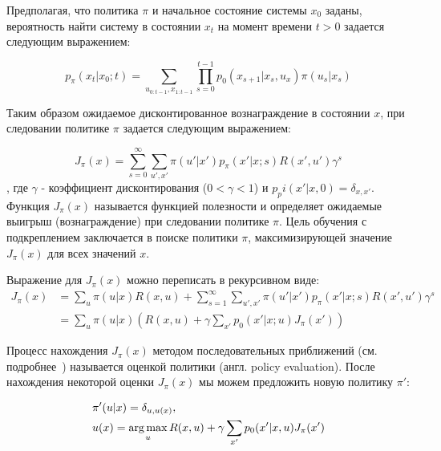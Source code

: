 Предполагая, что политика $\pi$ и начальное состояние системы $x_0$ заданы, вероятность найти систему в состоянии $x_t$ на момент времени $t > 0$ задается следующим выражением:

\begin{equation}
    \label{eq:pxxt}
     p_\pi(x_t|x_0; t) =
     \sum_{u_{0:t−1}, x_{1:t−1}}{
     	\prod_{s=0}^{t-1} {
        	p_0(x_{s+1}|x_s, u_x) \pi(u_s|x_s)
         }
      }
\end{equation}

Таким образом ожидаемое дисконтированное вознаграждение в состоянии $x$, при следовании политике $\pi$ задается следующим выражением:

\begin{equation}
    \label{eq:j_pi}
     J_{\pi}(x) =
     \sum_{s=0}^{\infty}
       \sum_{u', x'}{
          \pi(u'|x')p_\pi(x'|x; s)R(x', u')\gamma^s
        }
\end{equation}
, где $\gamma$ - коэффициент дисконтирования ($0 < \gamma < 1$) и $p_pi(x'|x, 0) = \delta_{x,x'}$. Функция $J_\pi(x)$ называется функцией полезности и определяет ожидаемые выигрыш (вознаграждение) при следовании политике $\pi$. Цель обучения с подкреплением заключается в поиске политики $\pi$, максимизирующей значение $J_\pi(x)$ для всех значений $x$.

Выражение для $J_\pi(x)$ можно переписать в рекурсивном виде:
\begin{equation}
    \label{eq:j_pi_rec}
    \begin{split}
     J_\pi(x) &=
     \sum_u {\pi(u|x)R(x,u)} +
     \sum_{s=1}^{\infty}
       \sum_{u', x'}{
          \pi(u'|x')p_\pi(x'|x; s)R(x', u')\gamma^s
        } \\
        &= \sum_u {\pi(u|x)} \left(
        R(x,u) + \gamma \sum_{x'}{
        		p_0(x'|x; u)J_{\pi}(x')
            }
       		\right)
            \end{split}
\end{equation}

Процесс нахождения $J_\pi(x)$ методом последовательных приближений (см. подробнее~\cite{sutton1998reinforcement}) называется оценкой политики (англ. policy evaluation). После нахождения некоторой оценки  $J_\pi(x)$ мы можем предложить новую политику $\pi'$:

\begin{equation}
    \label{eq:new_policy}
    \begin{split}
    & \pi'(u|x) = \delta_{u,u(x)}, \\
    & u(x) = \operatorname*{arg\,max}_u R(x, u) + \gamma \sum_{x'} p_0(x'|x, u)J_\pi(x')
    \end{split}
\end{equation}

